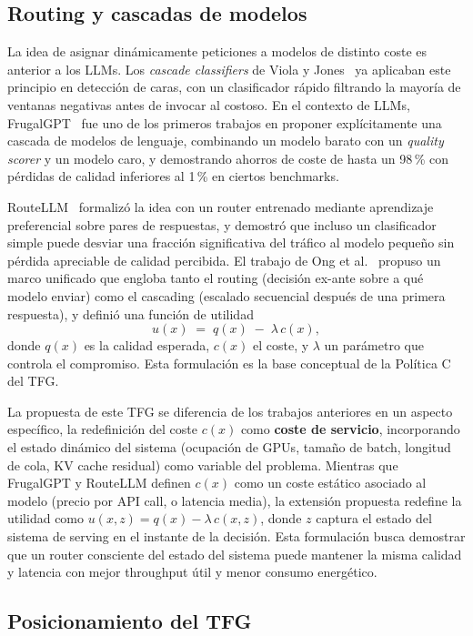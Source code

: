 \subsection{Routing y cascadas de modelos}

La idea de asignar dinámicamente peticiones a modelos de distinto coste es anterior a los LLMs. Los \textit{cascade classifiers} de Viola y Jones~\cite{viola2001cascade} ya aplicaban este principio en detección de caras, con un clasificador rápido filtrando la mayoría de ventanas negativas antes de invocar al costoso. En el contexto de LLMs, FrugalGPT~\cite{chen2023frugalgpt} fue uno de los primeros trabajos en proponer explícitamente una cascada de modelos de lenguaje, combinando un modelo barato con un \textit{quality scorer} y un modelo caro, y demostrando ahorros de coste de hasta un 98\,\% con pérdidas de calidad inferiores al 1\,\% en ciertos benchmarks.

RouteLLM~\cite{dekoninck2024routing} formalizó la idea con un router entrenado mediante aprendizaje preferencial sobre pares de respuestas, y demostró que incluso un clasificador simple puede desviar una fracción significativa del tráfico al modelo pequeño sin pérdida apreciable de calidad percibida. El trabajo de Ong et al.~\cite{ong2025routellm} propuso un marco unificado que engloba tanto el routing (decisión ex-ante sobre a qué modelo enviar) como el cascading (escalado secuencial después de una primera respuesta), y definió una función de utilidad
\[
u(x) \;=\; q(x) \;-\; \lambda\, c(x),
\]
donde $q(x)$ es la calidad esperada, $c(x)$ el coste, y $\lambda$ un parámetro que controla el compromiso. Esta formulación es la base conceptual de la Política C del TFG.

La propuesta de este TFG se diferencia de los trabajos anteriores en un aspecto específico, la redefinición del coste $c(x)$ como \textbf{coste de servicio}, incorporando el estado dinámico del sistema (ocupación de GPUs, tamaño de batch, longitud de cola, KV cache residual) como variable del problema. Mientras que FrugalGPT y RouteLLM definen $c(x)$ como un coste estático asociado al modelo (precio por API call, o latencia media), la extensión propuesta redefine la utilidad como $u(x,z) = q(x) - \lambda\,c(x,z)$, donde $z$ captura el estado del sistema de serving en el instante de la decisión. Esta formulación busca demostrar que un router consciente del estado del sistema puede mantener la misma calidad y latencia con mejor throughput útil y menor consumo energético.

\subsection{Posicionamiento del TFG}

